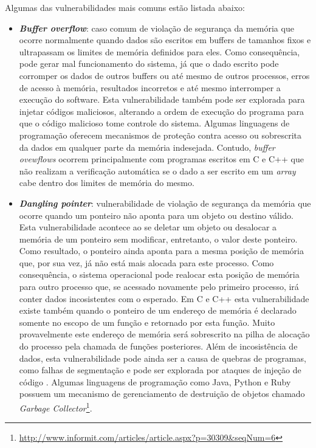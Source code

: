 %

Algumas das vulnerabilidades mais comuns estão listada abaixo:

%

\begin{itemize}
\item \textbf{\emph{Buffer overflow}}: caso comum de violação de segurança da memória que ocorre normalmente quando dados são escritos em buffers de tamanhos fixos e ultrapassam os limites de memória definidos para eles. Como consequência, pode gerar mal funcionamento do sistema, já que o dado escrito pode corromper os dados de outros buffers ou até mesmo de outros processos, erros de acesso à memória, resultados incorretos e até mesmo interromper a execução do software. Esta vulnerabilidade também pode ser explorada para injetar códigos maliciosos, alterando a ordem de execução do programa para que o código malicioso tome controle do sistema. Algumas linguagens de programação oferecem mecanismos de proteção contra acesso ou sobrescrita da dados em qualquer parte da memória indesejada. Contudo, \emph{buffer ovewflows} ocorrem principalmente com programas escritos em C e C++ que não realizam a verificação automática se o dado a ser escrito em um \emph{array} cabe dentro dos limites de memória do mesmo.
\item \textbf{\emph{Dangling pointer}}: vulnerabilidade de violação de segurança da memória que ocorre quando um ponteiro não aponta para um objeto ou destino válido. Esta vulnerabilidade acontece ao se deletar um objeto ou desalocar a memória de um ponteiro sem modificar, entretanto, o valor deste ponteiro. Como resultado, o ponteiro ainda aponta para a mesma posição de memória que, por sua vez, já não está mais alocada para este processo. Como consequência, o sistema operacional pode realocar esta posição de memória para outro processo que, se acessado novamente pelo primeiro processo, irá conter dados incosistentes com o esperado. Em C e C++ esta vulnerabilidade existe também quando o ponteiro de um endereço de memória é declarado somente no escopo de um função e retornado por esta função. Muito provavelmente este endereço de memória será sobrescrito na pilha de alocação do processo pela chamada de funções posteriores. Além de incosistência de dados, esta vulnerabilidade pode ainda ser a causa de quebras de programas, como falhas de segmentação e pode ser explorada por ataques de injeção de código \cite{afek2007}. Algumas linguagens de programação como Java, Python e Ruby possuem um mecanismo de gerenciamento de destruição de objetos chamado \emph{Garbage Collector}\footnote{\url{http://www.informit.com/articles/article.aspx?p=30309&seqNum=6}}. 

\end{itemize}
